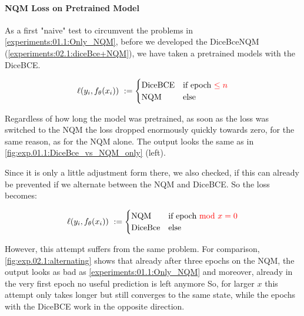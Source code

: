 \paragraph{NQM Loss on Pretrained Model}
\label{experiments:02.2.1:Only_NQM_Pretrained}
As a first "naive" test to circumvent the problems in \autoref{experiments:01.1:Only_NQM}, before we developed the DiceBceNQM (\autoref{experiments:02.1:diceBce+NQM}), we have taken a pretrained models with the DiceBCE.

\begin{align}
    \ell(y_i, f_\theta(x_i))\ :=
      \begin{cases}
        \mathrm{DiceBCE} & \text{if epoch {\color{red}$\leq n$}}\\
        \mathrm{NQM} & \text{else}\\
      \end{cases}
\end{align}

Regardless of how long the model was pretrained, as soon as the loss was switched to the NQM the loss dropped enormously quickly towards zero, for the same reason, as for the NQM alone. The output looks the same as in \autoref{fig:exp.01.1:DiceBce_vs_NQM_only} (left).

Since it is only a little adjustment form there, we also checked, if this can already be prevented if we alternate between the NQM and DiceBCE. So the loss becomes:

\begin{align}
    \ell(y_i, f_\theta(x_i))\ :=
      \begin{cases}
        \mathrm{NQM} & \text{if epoch {\color{red} mod $x=0$}}\\
        \mathrm{DiceBce} & \text{else}\\
      \end{cases}
\end{align}

However, this attempt suffers from the same problem. For comparison, \autoref{fig:exp.02.1:alternating} shows that already after three epochs on the NQM, the output looks as bad as \autoref{experiments:01.1:Only_NQM} and moreover, already in the very first epoch no useful prediction is left anymore So, for larger $x$ this attempt only takes longer but still converges to the same state, while the epochs with the DiceBCE work in the opposite direction.

